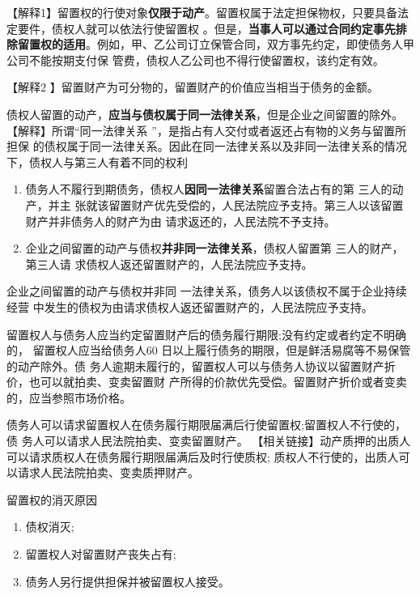 \documentclass[UTF8,12pt]{ctexart}
\numberwithin{equation}{section} %
\numberwithin{figure}{section}
\numberwithin{table}{section}
\begin{document}
	【解释1】留置权的行使对象\textbf{仅限于动产}。留置权属于法定担保物权，只要具备法定要件，债权人就可以依法行使留置权 。但是，\textbf{当事人可以通过合同约定事先排除留置权的适用}。例如，甲、乙公司订立保管合同，双方事先约定，即使债务人甲公司不能按期支付保 管费，债权人乙公司也不得行使留置权，该约定有效。
	
	【解释2 】留置财产为可分物的，留置财产的价值应当相当于债务的金额。
	
	
	债权人留置的动产，\textbf{应当与债权属于同一法律关系}，但是企业之间留置的除外。 【解释】所谓“同一法律关系 ”，是指占有人交付或者返还占有物的义务与留置所担保 的债权属于同一法律关系。因此在同一法律关系以及非同一法律关系的情况下，债权人与第三人有着不同的权利
	\begin{enumerate}
		\item 债务人不履行到期债务，债权人\textbf{因同一法律关系}留置合法占有的第 三人的动产，并主 张就该留置财产优先受偿的，人民法院应予支持。第三人以该留置财产并非债务人的财产为由 请求返还的，人民法院不予支持。
		
		\item 企业之间留置的动产与债权\textbf{并非同一法律关系}，债权人留置第 三人的财产，第三人请 求债权人返还留置财产的，人民法院应予支持。
	\end{enumerate}
	
	企业之间留置的动产与债权并非同 一法律关系，债务人以该债权不属于企业持续经营 中发生的债权为由请求债权人返还留置财产的，人民法院应予支持。
	
	留置权人与债务人应当约定留置财产后的债务履行期限;没有约定或者约定不明确的， 留置权人应当给债务人60 日以上履行债务的期限，但是鲜活易腐等不易保管的动产除外。债 务人逾期未履行的，留置权人可以与债务人协议以留置财产折价，也可以就拍卖、变卖留置财 产所得的价款优先受偿。留置财产折价或者变卖的，应当参照市场价格。
	
	债务人可以请求留置权人在债务履行期限届满后行使留置权;留置权人不行使的，债 务人可以请求人民法院拍卖、变卖留置财产。
	【相关链接】动产质押的出质人可以请求质权人在债务履行期限届满后及时行使质权; 质权人不行使的，出质人可以请求人民法院拍卖、变卖质押财产。
	
	留置权的消灭原因
	\begin{enumerate}
		\item 债权消灭;
		
		\item 留置权人对留置财产丧失占有; 
		
		\item 债务人另行提供担保并被留置权人接受。
	\end{enumerate}
	
\end{document}
